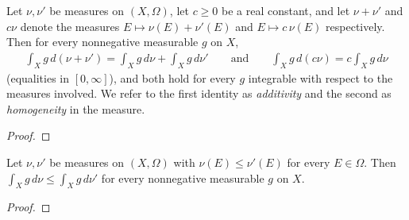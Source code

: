\begin{proposition}
    \label{prpstn:additivity-of-the-integral-in-the-measure}
    \leanok
    Let $\nu, \nu'$ be measures on $(X,\Omega)$, let $c \ge 0$ be a real constant, and let $\nu + \nu'$ and $c\nu$ denote the measures $E \mapsto \nu(E)+\nu'(E)$ and $E \mapsto c\,\nu(E)$ respectively. Then for every nonnegative measurable $g$ on $X$,
    \begin{align}
        \int_X g \, d(\nu + \nu') = \int_X g \, d\nu + \int_X g \, d\nu'
        \qquad\text{and}\qquad
        \int_X g \, d(c\nu) = c\int_X g \, d\nu
    \end{align}
    (equalities in $[0,\infty]$), and both hold for every $g$ integrable with respect to the measures involved. We refer to the first identity as \textit{additivity} and the second as \textit{homogeneity} in the measure.
\end{proposition}
\begin{proof}
\leanok
\end{proof}

\begin{proposition}
    \label{prpstn:monotonicity-of-the-integral-in-the-measure}
    \leanok
    Let $\nu, \nu'$ be measures on $(X, \Omega)$ with $\nu(E) \le \nu'(E)$ for every $E \in \Omega$. Then $\int_X g \, d\nu \le \int_X g \, d\nu'$ for every nonnegative measurable $g$ on $X$.
\end{proposition}
\begin{proof}
\leanok
\end{proof}

